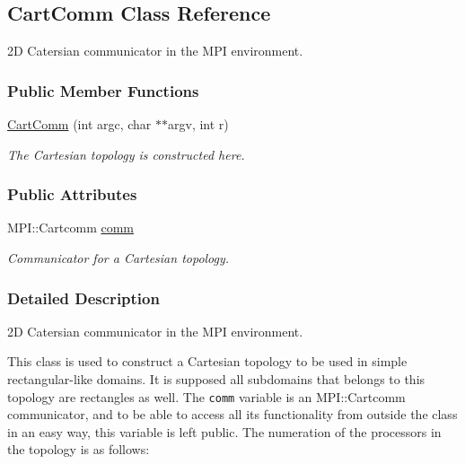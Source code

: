 \hypertarget{classCartComm}{
\subsection{CartComm Class Reference}
\label{classCartComm}
}
2D Catersian communicator in the MPI environment.  


\subsubsection*{Public Member Functions}
\begin{CompactItemize}
\item 
\hypertarget{classCartComm_4f03e8170c309438b9afe23c8b690226}{
\hyperlink{classCartComm_4f03e8170c309438b9afe23c8b690226}{CartComm} (int argc, char $\ast$$\ast$argv, int r)}
\label{classCartComm_4f03e8170c309438b9afe23c8b690226}

\begin{CompactList}\small\item\em The Cartesian topology is constructed here. \item\end{CompactList}\end{CompactItemize}
\subsubsection*{Public Attributes}
\begin{CompactItemize}
\item 
\hypertarget{classCartComm_2d8ba330e7e59eb0582238b5e79b6a30}{
MPI::Cartcomm \hyperlink{classCartComm_2d8ba330e7e59eb0582238b5e79b6a30}{comm}}
\label{classCartComm_2d8ba330e7e59eb0582238b5e79b6a30}

\begin{CompactList}\small\item\em Communicator for a Cartesian topology. \item\end{CompactList}\end{CompactItemize}


\subsubsection{Detailed Description}
2D Catersian communicator in the MPI environment. 

This class is used to construct a Cartesian topology to be used in simple rectangular-like domains. It is supposed all subdomains that belongs to this topology are rectangles as well. The {\tt comm} variable is an MPI::Cartcomm communicator, and to be able to access all its functionality from outside the class in an easy way, this variable is left public. The numeration of the processors in the topology is as follows: 

